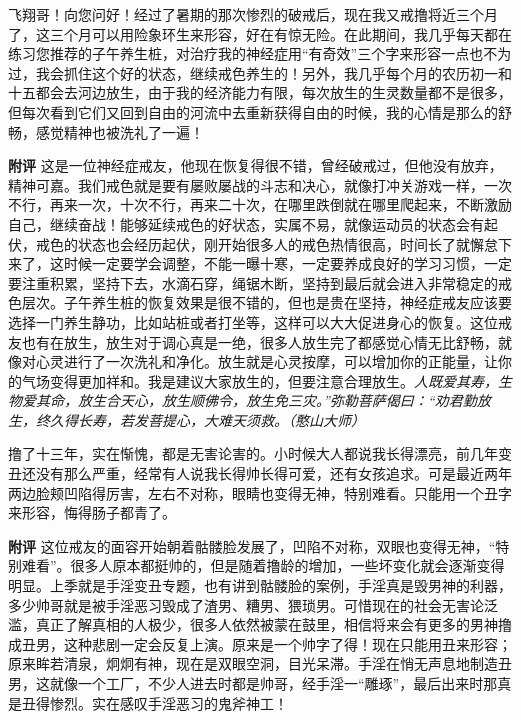 \begin{case}
    飞翔哥！向您问好！经过了暑期的那次惨烈的破戒后，现在我又戒撸将近三个月了，这三个月可以用险象环生来形容，好在有惊无险。在此期间，我几乎每天都在练习您推荐的子午养生桩，对治疗我的神经症用“有奇效”三个字来形容一点也不为过，我会抓住这个好的状态，继续戒色养生的！另外，我几乎每个月的农历初一和十五都会去河边放生，由于我的经济能力有限，每次放生的生灵数量都不是很多，但每次看到它们又回到自由的河流中去重新获得自由的时候，我的心情是那么的舒畅，感觉精神也被洗礼了一遍！

    \textbf{附评} 这是一位神经症戒友，他现在恢复得很不错，曾经破戒过，但他没有放弃，精神可嘉。我们戒色就是要有屡败屡战的斗志和决心，就像打冲关游戏一样，一次不行，再来一次，十次不行，再来二十次，在哪里跌倒就在哪里爬起来，不断激励自己，继续奋战！能够延续戒色的好状态，实属不易，就像运动员的状态会有起伏，戒色的状态也会经历起伏，刚开始很多人的戒色热情很高，时间长了就懈怠下来了，这时候一定要学会调整，不能一曝十寒，一定要养成良好的学习习惯，一定要注重积累，坚持下去，水滴石穿，绳锯木断，坚持到最后就会进入非常稳定的戒色层次。子午养生桩的恢复效果是很不错的，但也是贵在坚持，神经症戒友应该要选择一门养生静功，比如站桩或者打坐等，这样可以大大促进身心的恢复。这位戒友也有在放生，放生对于调心真是一绝，很多人放生完了都感觉心情无比舒畅，就像对心灵进行了一次洗礼和净化。放生就是心灵按摩，可以增加你的正能量，让你的气场变得更加祥和。我是建议大家放生的，但要注意合理放生。\textit{人既爱其寿，生物爱其命，放生合天心，放生顺佛令，放生免三灾。”弥勒菩萨偈曰：“劝君勤放生，终久得长寿，若发菩提心，大难天须救。（憨山大师）}
\end{case}

\begin{case}
    撸了十三年，实在惭愧，都是无害论害的。小时候大人都说我长得漂亮，前几年变丑还没有那么严重，经常有人说我长得帅长得可爱，还有女孩追求。可是最近两年两边脸颊凹陷得厉害，左右不对称，眼睛也变得无神，特别难看。只能用一个丑字来形容，悔得肠子都青了。

    \textbf{附评} 这位戒友的面容开始朝着骷髅脸发展了，凹陷不对称，双眼也变得无神，“特别难看”。很多人原本都挺帅的，但是随着撸龄的增加，一些坏变化就会逐渐变得明显。上季就是手淫变丑专题，也有讲到骷髅脸的案例，手淫真是毁男神的利器，多少帅哥就是被手淫恶习毁成了渣男、糟男、猥琐男。可惜现在的社会无害论泛滥，真正了解真相的人极少，很多人依然被蒙在鼓里，相信将来会有更多的男神撸成丑男，这种悲剧一定会反复上演。原来是一个帅字了得！现在只能用丑来形容；原来眸若清泉，炯炯有神，现在是双眼空洞，目光呆滞。手淫在悄无声息地制造丑男，这就像一个工厂，不少人进去时都是帅哥，经手淫一“雕琢”，最后出来时那真是丑得惨烈。实在感叹手淫恶习的鬼斧神工！
\end{case}


